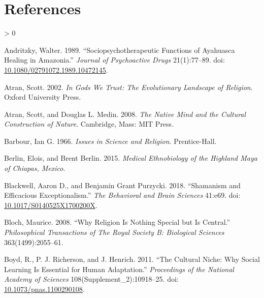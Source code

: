 \documentclass[
  11pt,
]{article}
\newlength{\cslhangindent}
\newenvironment{CSLReferences}[2] %
 {%
  \setlength{\parindent}{0pt}
  \ifodd #1 \everypar{\setlength{\hangindent}{\cslhangindent}}\ignorespaces\fi
  \ifnum #2 > 0
  \setlength{\parskip}{#2\baselineskip}
  \fi
 }%
 {}
\begin{document}
\hypertarget{references}{%
\section*{References}\label{references}}

\hypertarget{refs}{}
\begin{CSLReferences}{1}{0}
\leavevmode\hypertarget{ref-andritzkySociopsychotherapeuticFunctionsAyahuasca1989}{}%
Andritzky, Walter. 1989. {``Sociopsychotherapeutic {Functions} of {Ayahuasca Healing} in {Amazonia}.''} \emph{Journal of Psychoactive Drugs} 21(1):77--89. doi: \href{https://doi.org/10.1080/02791072.1989.10472145}{10.1080/02791072.1989.10472145}.

\leavevmode\hypertarget{ref-atran2002gods}{}%
Atran, Scott. 2002. \emph{In Gods We Trust: {The} Evolutionary Landscape of Religion}. {Oxford University Press}.

\leavevmode\hypertarget{ref-atranNativeMindCultural2008}{}%
Atran, Scott, and Douglas L. Medin. 2008. \emph{The Native Mind and the Cultural Construction of Nature}. {Cambridge, Mass}: {MIT Press}.

\leavevmode\hypertarget{ref-barbourIssuesScienceReligion1966}{}%
Barbour, Ian G. 1966. \emph{Issues in {Science} and {Religion}}. {Prentice-Hall}.

\leavevmode\hypertarget{ref-berlinMedicalEthnobiologyHighland2015}{}%
Berlin, Elois, and Brent Berlin. 2015. \emph{Medical {Ethnobiology} of the {Highland Maya} of {Chiapas}, {Mexico}}.

\leavevmode\hypertarget{ref-blackwellShamanismEfficaciousExceptionalism2018}{}%
Blackwell, Aaron D., and Benjamin Grant Purzycki. 2018. {``Shamanism and Efficacious Exceptionalism.''} \emph{The Behavioral and Brain Sciences} 41:e69. doi: \href{https://doi.org/10.1017/S0140525X1700200X}{10.1017/S0140525X1700200X}.

\leavevmode\hypertarget{ref-bloch2008religion}{}%
Bloch, Maurice. 2008. {``Why Religion Is Nothing Special but Is Central.''} \emph{Philosophical Transactions of The Royal Society B: Biological Sciences} 363(1499):2055--61.

\leavevmode\hypertarget{ref-boydCulturalNicheWhy2011}{}%
Boyd, R., P. J. Richerson, and J. Henrich. 2011. {``The Cultural Niche: {Why} Social Learning Is Essential for Human Adaptation.''} \emph{Proceedings of the National Academy of Sciences} 108(Supplement\_2):10918--25. doi: \href{https://doi.org/10.1073/pnas.1100290108}{10.1073/pnas.1100290108}.


\end{CSLReferences}
\end{document}
